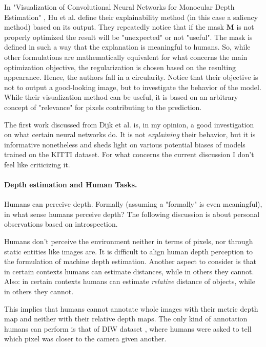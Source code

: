 In "Visualization of Convolutional Neural Networks for Monocular Depth Estimation" \cite{Hu}, Hu et al. define their explainability method (in this case a saliency method) based on its output.
They repeatedly notice that if the mask $\textbf{M}$ is not properly optimized the result will be "unexpected" or not "useful".
The mask is defined in such a way that the explanation is meaningful to humans.
So, while other formulations are mathematically equivalent for what concerns the main optimization objective, the regularization is chosen based on the resulting appearance.
Hence, the authors fall in a circularity.
Notice that their objective is not to output a good-looking image, but to investigate the behavior of the model.
While their visualization method can be useful, it is based on an arbitrary concept of "relevance" for pixels contributing to the prediction.

The first work discussed from Dijk et al. \cite{Dijk} is, in my opinion, a good investigation on what certain neural networks do.
It is not \textit{explaining} their behavior, but it is informative nonetheless and sheds light on various potential biases of models trained on the KITTI dataset.
For what concerns the current discussion I don't feel like criticizing it.

\vfill

\paragraph{Depth estimation and Human Tasks.}
Humans can perceive depth.
Formally (assuming a "formally" is even meaningful), in what sense humans perceive depth?
The following discussion is about personal observations based on introspection.

Humans don't perceive the environment neither in terms of pixels, nor through static entities like images are.
It is difficult to align human depth perception to the formulation of machine depth estimation.
Another aspect to consider is that in certain contexts humans can estimate distances, while in others they cannot.
Also: in certain contexts humans can estimate \textit{relative} distance of objects, while in others they cannot.

This implies that humans cannot annotate whole images with their metric depth map and neither with their relative depth maps.
The only kind of annotation humans can perform is that of DIW dataset \cite{DIW}, where humans were asked to tell which pixel was closer to the camera given another.

